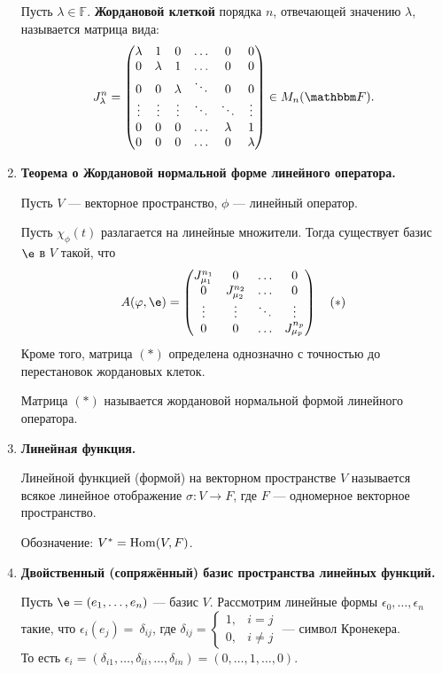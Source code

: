 \begin{enumerate}
Пусть $\lambda \in \mathbb{F}$. \textbf{Жордановой клеткой} порядка $n$, отвечающей значению $\lambda$, называется матрица вида:
\begin{gather*}
J_\l^n = 
\begin{pmatrix}
\l & 1 & 0 & \ldots & 0 & 0 \\
0 & \l & 1 & \ldots & 0 & 0 \\
0 & 0 & \l & \ddots & 0 & 0 \\
\vdots & \vdots & \vdots & \ddots & \ddots & \vdots \\
0 & 0 & 0 & \ldots & \l & 1 \\
0 & 0 & 0 & \ldots & 0 & \l
\end{pmatrix} \in M_n(\mathbb{F}).
\end{gather*}
\item \textbf{Теорема о Жордановой нормальной форме линейного оператора.}


Пусть $V$ --- векторное пространство, $\phi$ --- линейный оператор.

Пусть $\chi_\phi(t)$ разлагается на линейные множители. Тогда существует базис $\e$ в $V$ такой, что 
\begin{gather*}
A(\phi, \e) = 
\begin{pmatrix*}
J_{\mu_1}^{n_1} & 0 & \ldots & 0 \\
0 & J_{\mu_2}^{n_2} & \ldots & 0 \\
\vdots & \vdots & \ddots & \vdots \\
0 & 0 & \ldots & J_{\mu_p}^{n_p}
\end{pmatrix*} \quad (*)
\end{gather*}
Кроме того, матрица $(*)$ определена однозначно с точностью до перестановок жордановых клеток.

Матрица $(*)$ называется жордановой нормальной формой линейного оператора.
\item \textbf{Линейная функция.}

Линейной функцией (формой) на векторном пространстве $V$ называется всякое линейное отображение $\sigma \colon V \rightarrow F$, где $F$ --- одномерное векторное пространство. 

Обозначение: $V^* = \mathrm{Hom}(V, F)$.
\item \textbf{Двойственный (сопряжённый) базис пространства линейных функций.} 

Пусть $\e = (e_1, \ldots, e_n)$ --- базис $V$. Рассмотрим линейные формы $\epsilon_0, \ldots, \epsilon_n$ такие, что $\epsilon_i(e_j) =~\delta_{ij}$, где $\delta_{ij} =
\begin{cases}
1, & i = j \\
0, & i \neq j
\end{cases}
$ --- символ Кронекера. \\То есть $\epsilon_i = (\delta_{i1}, \ldots, \delta_{ii}, \ldots, \delta_{in}) = (0, \ldots, 1, \ldots, 0)$.


\end{enumerate}
